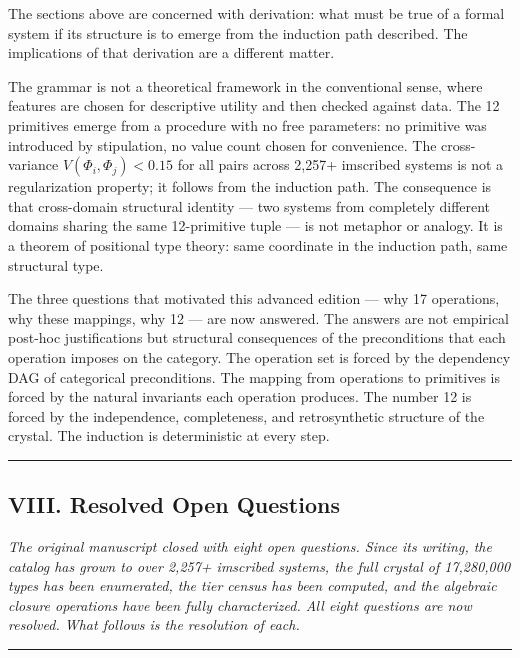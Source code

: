 \documentclass[12pt,a4paper]{article}
\begin{document}
The sections above are concerned with derivation: what must be true of a formal system if its structure is to emerge from the induction path described. The implications of that derivation are a different matter.

The grammar is not a theoretical framework in the conventional sense, where features are chosen for descriptive utility and then checked against data. The 12 primitives emerge from a procedure with no free parameters: no primitive was introduced by stipulation, no value count chosen for convenience. The cross-variance $V(Φ_i,Φ_j) < 0.15$ for all pairs across 2,257+ imscribed systems is not a regularization property; it follows from the induction path. The consequence is that cross-domain structural identity --- two systems from completely different domains sharing the same 12-primitive tuple --- is not metaphor or analogy. It is a theorem of positional type theory: same coordinate in the induction path, same structural type.

The three questions that motivated this advanced edition --- why 17 operations, why these mappings, why 12 --- are now answered. The answers are not empirical post-hoc justifications but structural consequences of the preconditions that each operation imposes on the category. The operation set is forced by the dependency DAG of categorical preconditions. The mapping from operations to primitives is forced by the natural invariants each operation produces. The number 12 is forced by the independence, completeness, and retrosynthetic structure of the crystal. The induction is deterministic at every step.

\begin{center}
\rule{0.5\textwidth}{0.4pt}
\end{center}

\subsection{VIII. Resolved Open Questions}

\emph{The original manuscript closed with eight open questions. Since its writing, the catalog has grown to over 2,257+ imscribed systems, the full crystal of 17,280,000 types has been enumerated, the tier census has been computed, and the algebraic closure operations have been fully characterized. All eight questions are now resolved. What follows is the resolution of each.}

\begin{center}
\rule{0.5\textwidth}{0.4pt}
\end{center}
\end{document}
